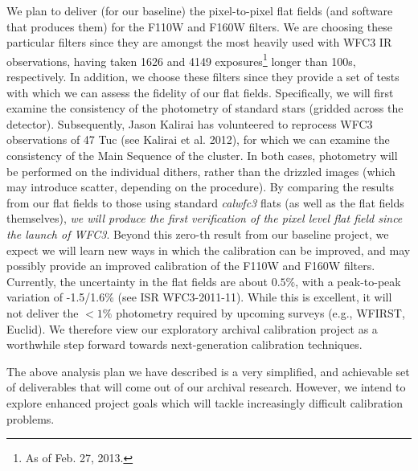 \documentclass[12pt]{article}
\begin{document}
We plan to deliver (for our baseline) the pixel-to-pixel flat
fields (and software that produces them) for the F110W and F160W
filters.  We are choosing these particular filters since they are
amongst the most heavily used with WFC3 IR observations, having taken
1626 and 4149 exposures\footnote{As of Feb. 27, 2013.} longer than
100s, respectively.  In addition, we choose these filters
since they provide a set of tests with which we can assess the
fidelity of our flat fields.  Specifically, we will first examine the
consistency of the photometry of standard stars (gridded across 
the detector).  Subsequently, Jason Kalirai has volunteered to
reprocess WFC3 observations of 47 Tuc (see Kalirai et al. 2012), for
which we can examine the consistency of the Main Sequence of the
cluster.  In both cases, photometry will be performed on the
individual dithers, rather than the drizzled images (which may
introduce scatter, depending on the procedure).  By comparing the
results from our flat fields to those using standard \emph{calwfc3}
flats (as well as the flat fields themselves), \emph{we will produce
  the first verification of the pixel level flat field since the
  launch of WFC3}.  Beyond this zero-th result from our baseline
project, we expect we will learn new ways in which the calibration can
be improved, and may possibly provide an improved calibration of the
F110W and F160W filters.  Currently, the uncertainty in the flat
fields are about $0.5\%$, with a peak-to-peak variation of -1.5/1.6\%
(see ISR WFC3-2011-11).  While this is excellent, it will not deliver
the $<1\%$ photometry required by upcoming surveys (e.g., WFIRST,
Euclid).  We therefore view our exploratory archival calibration
project as a worthwhile step forward towards next-generation
calibration techniques.

The above analysis plan we have described is a very simplified, and
achievable set of deliverables that will come out of our archival
research.  However, we intend to explore enhanced project goals which
will tackle increasingly difficult calibration problems. 

%
%
\budgetnarrative       %
\end{document}
